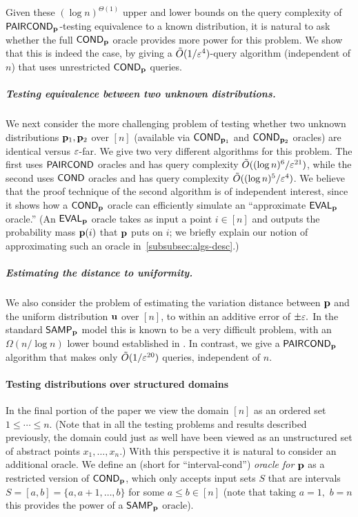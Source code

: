 Given these $(\log n)^{\Theta(1)}$
upper and lower bounds on the query complexity of
${\sf PAIRCOND}_{\mathbf{p}}$-testing equivalence to a known distribution, it is natural to
ask whether the full ${\sf COND}_{\mathbf{p}}$ oracle provides more power for this problem.
We show that this is indeed the case, by giving a
$\tilde{O}(1/\varepsilon^4)$-query algorithm
(independent of $n$) that uses unrestricted ${\sf COND}_{\mathbf{p}}$ queries.

\subparagraph{Testing equivalence between two unknown distributions.}
We next consider the more challenging problem of testing whether two unknown
distributions $\mathbf{p}_1,\mathbf{p}_2$ over $[n]$ (available via ${\sf COND}_{\mathbf{p}_1}$
and ${\sf COND}_{\mathbf{p}_2}$ oracles) are identical versus $\varepsilon$-far.
We give two very different algorithms for this problem.  The first uses
${\sf PAIRCOND}$ oracles and has query complexity
$\tilde{O}((\log n)^6/\varepsilon^{21})$, while the second
uses ${\sf COND}$ oracles and has query complexity
{$\tilde{O}((\log n)^5/\varepsilon^4)$.}
We {believe} that the proof technique of the second algorithm is of independent
interest, since it shows how a ${\sf COND}_{\mathbf{p}}$ oracle can efficiently simulate
an ``approximate ${\sf EVAL}_{\mathbf{p}}$ oracle.''  (An ${\sf EVAL}_{\mathbf{p}}$ oracle takes as input a
point $i \in [n]$ and outputs the probability mass $\mathbf{p}(i)$ that $\mathbf{p}$
puts on $i$; {we briefly explain our notion of approximating
such an oracle in~\cref{subsubsec:algs-desc}}.)

\subparagraph{Estimating the distance to uniformity.}  We also consider the problem of
estimating {the variation distance} between $\mathbf{p}$ and
the uniform distribution $\mathbf{u}$ over $[n]$, to within an additive error of
$\pm \varepsilon.$  In the standard ${\sf SAMP}_{\mathbf{p}}$ model this is known to be a very
difficult problem, with an $\Omega(n/\log n)$ lower bound established in
{\cite{ValiantValiant:11,ValiantValiant:10lb}}.  In contrast, we give a
${\sf PAIRCOND}_{\mathbf{p}}$ algorithm that makes only $\tilde{O}(1/\varepsilon^{20})$
queries, independent of $n$.


\paragraph{Testing distributions over structured domains}
In the final portion of the paper we view the domain $[n]$ as an ordered
set $1 \leq \cdots \leq n$.  (Note that in all the testing problems and results
described previously, the domain could just as well have been viewed
as an unstructured set of abstract points $x_1,\dots,x_n$.)  With this
perspective it is natural to consider an additional oracle.
We define an \emph{\ICOND} (short for ``interval-cond'')
\emph{oracle for $\mathbf{p}$} as a restricted version
of ${\sf COND}_{\mathbf{p}}$, which only accepts input sets $S$ that are intervals
$S=[a,b]=\{a,a+1,\dots,b\}$ for some $a \leq b \in [n]$ (note that
taking $a=1,$ $b=n$ this provides the power of a ${\sf SAMP}_{\mathbf{p}}$ oracle).

